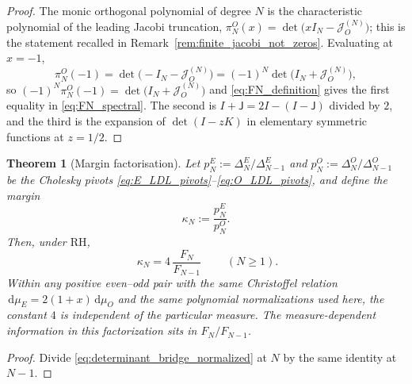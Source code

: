 \documentclass[preprint,12pt]{elsarticle}
\numberwithin{equation}{section}
\theoremstyle{plain}
\newtheorem{theorem}{Theorem}[section]
\theoremstyle{definition}
\theoremstyle{remark}
\newcommand{\RH}{\mathrm{RH}}
\newcommand{\J}{\mathsf J}
\newcommand{\dd}{\,\mathrm d}
\begin{document}
\begin{proof}
The monic orthogonal polynomial of degree $N$ is the characteristic polynomial of the
leading Jacobi truncation, $\pi_N^O(x)=\det\bigl(xI_N-\mathcal J_O^{(N)}\bigr)$; this is the
statement recalled in Remark~\ref{rem:finite_jacobi_not_zeros}.  Evaluating at $x=-1$,
\begin{equation}
 \pi_N^O(-1)=\det\bigl(-I_N-\mathcal J_O^{(N)}\bigr)=(-1)^N\det\bigl(I_N+\mathcal J_O^{(N)}\bigr),
\end{equation}
so $(-1)^N\pi_N^O(-1)=\det\bigl(I_N+\mathcal J_O^{(N)}\bigr)$ and \eqref{eq:FN_definition} gives the
first equality in \eqref{eq:FN_spectral}.  The second is $I+\J=2I-(I-\J)$ divided by $2$,
and the third is the expansion of $\det(I-zK)$ in elementary symmetric functions at
$z=1/2$.
\end{proof}

\begin{theorem}[Margin factorisation]
\label{thm:margin_factorisation}
Let $p_N^E:=\Delta_N^E/\Delta_{N-1}^E$ and $p_N^O:=\Delta_N^O/\Delta_{N-1}^O$ be the
Cholesky pivots \eqref{eq:E_LDL_pivots}--\eqref{eq:O_LDL_pivots}, and define the
\emph{margin}
\begin{equation}
 \kappa_N:=\frac{p_N^E}{p_N^O}.
 \label{eq:kappa_definition}
\end{equation}
Then, under $\RH$,
\begin{equation}
 \boxed{\;\kappa_N=4\,\frac{F_N}{F_{N-1}}\;}
 \qquad(N\ge1).
 \label{eq:margin_factorisation}
\end{equation}
Within any positive even--odd pair with the same Christoffel relation
\(\dd\mu_E=2(1+x)\dd\mu_O\) and the same polynomial normalizations used here, the
constant \(4\) is independent of the particular measure.  The measure-dependent
information in this factorization sits in \(F_N/F_{N-1}\).
\end{theorem}

\begin{proof}
Divide \eqref{eq:determinant_bridge_normalized} at $N$ by the same identity at $N-1$.
\end{proof}
\end{document}

